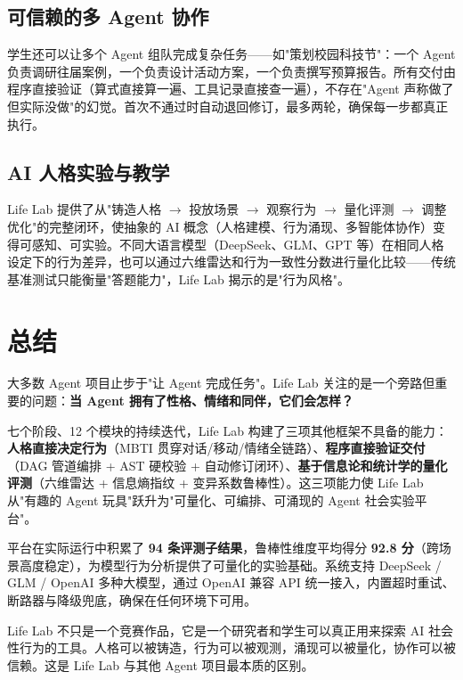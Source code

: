 \documentclass[12pt,a4paper]{article}%
\begin{document}
\subsection{可信赖的多 Agent 协作}

学生还可以让多个 Agent 组队完成复杂任务——如"策划校园科技节"：一个 Agent 负责调研往届案例，一个负责设计活动方案，一个负责撰写预算报告。所有交付由程序直接验证（算式直接算一遍、工具记录直接查一遍），不存在"Agent 声称做了但实际没做"的幻觉。首次不通过时自动退回修订，最多两轮，确保每一步都真正执行。

\subsection{AI 人格实验与教学}

Life Lab 提供了从"铸造人格 $\to$ 投放场景 $\to$ 观察行为 $\to$ 量化评测 $\to$ 调整优化"的完整闭环，使抽象的 AI 概念（人格建模、行为涌现、多智能体协作）变得可感知、可实验。不同大语言模型（DeepSeek、GLM、GPT 等）在相同人格设定下的行为差异，也可以通过六维雷达和行为一致性分数进行量化比较——传统基准测试只能衡量"答题能力"，Life Lab 揭示的是"行为风格"。

\section{总结}

大多数 Agent 项目止步于"让 Agent 完成任务"。Life Lab 关注的是一个旁路但重要的问题：\textbf{当 Agent 拥有了性格、情绪和同伴，它们会怎样？}

七个阶段、12 个模块的持续迭代，Life Lab 构建了三项其他框架不具备的能力：\textbf{人格直接决定行为}（MBTI 贯穿对话/移动/情绪全链路）、\textbf{程序直接验证交付}（DAG 管道编排 + AST 硬校验 + 自动修订闭环）、\textbf{基于信息论和统计学的量化评测}（六维雷达 + 信息熵指纹 + 变异系数鲁棒性）。这三项能力使 Life Lab 从"有趣的 Agent 玩具"跃升为"可量化、可编排、可涌现的 Agent 社会实验平台"。

平台在实际运行中积累了 \textbf{94 条评测子结果}，鲁棒性维度平均得分 \textbf{92.8 分}（跨场景高度稳定），为模型行为分析提供了可量化的实验基础。系统支持 DeepSeek / GLM / OpenAI 多种大模型，通过 OpenAI 兼容 API 统一接入，内置超时重试、断路器与降级兜底，确保在任何环境下可用。

Life Lab 不只是一个竞赛作品，它是一个研究者和学生可以真正用来探索 AI 社会性行为的工具。人格可以被铸造，行为可以被观测，涌现可以被量化，协作可以被信赖。这是 Life Lab 与其他 Agent 项目最本质的区别。
\end{document}
